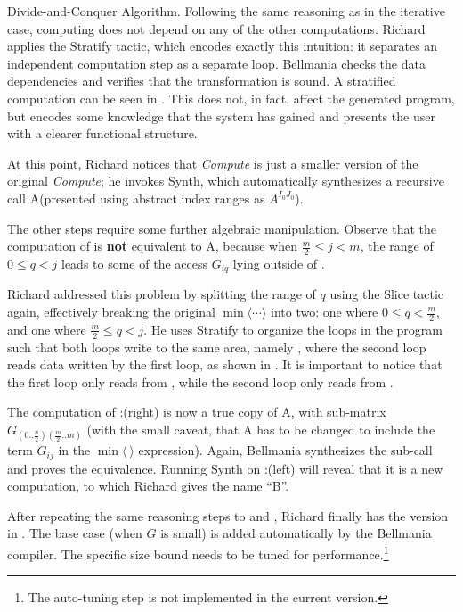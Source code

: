 \begin{paragraph}{Divide-and-Conquer Algorithm.}
Following the same reasoning as in the iterative case, computing 
does not depend on any of the other computations. Richard applies the
{\sf Stratify} tactic, which encodes exactly this intuition: it separates
an independent computation step as a separate loop.
Bellmania checks the data dependencies and verifies that the transformation
is sound.
A stratified computation can be seen in . This does not,
in fact, affect the generated program, but encodes some knowledge that the
system has gained and presents the user with a clearer functional structure.
\end{paragraph}

\medskip
At this point, Richard notices that {\it Compute } is just a smaller version of
the original {\it Compute}; he invokes {\sf Synth}, which automatically
synthesizes a recursive call A
(presented using abstract index ranges as $A^{I_0J_0}$).

The other steps require some further algebraic manipulation.
Observe that the computation of  is {\bf not} equivalent to
A, 
because when $\frac{m}{2} \leq j < m$, the range of $0\leq q < j$ leads to
some of the access $G_{iq}$ lying outside of .

Richard addressed this problem by splitting the range of $q$ using the {\sf Slice}
tactic again, effectively breaking the original $\min\langle\cdots\rangle$ into two:
one where $0\leq q < \frac{m}{2}$,
and one where $\frac{m}{2}\leq q < j$. 
He uses {\sf Stratify} to organize the loops in the program such that both 
loops write to the same area, namely , where the second loop reads data
written by the first loop, as shown in .
It is important to notice that the first loop only reads from , 
while the second loop only reads from .

The computation of :(right) is now a true copy of A,
with sub-matrix $G_{(0..\frac{n}{2})(\frac{m}{2}..m)}$ (with the small caveat,
that A has to be changed to include the term $G_{ij}$ in the $\min\langle~\rangle$ expression).
Again, Bellmania synthesizes the sub-call and proves the equivalence.
Running {\sf Synth} on :(left) will reveal that it is a new computation,
to which Richard gives the name ``B''. 

After repeating
the same reasoning steps to  and ,
Richard finally has the version in .
The base case (when $G$ is small) is added automatically by the Bellmania compiler.
The specific size bound needs to be tuned for performance.\footnote{The auto-tuning step is not implemented in the current version.}


